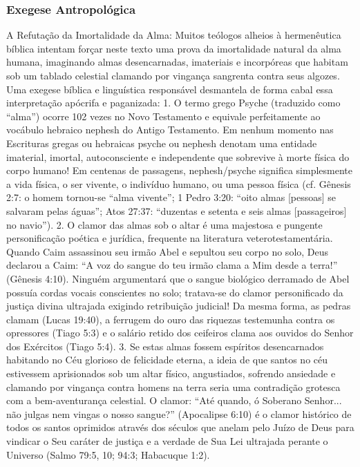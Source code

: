 \documentclass[11pt,a4paper,openany]{book}
\begin{document}
\subsubsection*{Exegese Antropológica}
A Refutação da Imortalidade da Alma:
Muitos teólogos alheios à hermenêutica bíblica intentam forçar neste texto uma prova da imortalidade natural da alma humana, imaginando almas desencarnadas, imateriais e incorpóreas que habitam sob um tablado celestial clamando por vingança sangrenta contra seus algozes. Uma exegese bíblica e linguística responsável desmantela de forma cabal essa interpretação apócrifa e paganizada:
1. O termo grego Psyche (traduzido como ``alma'') ocorre 102 vezes no Novo Testamento e equivale perfeitamente ao vocábulo hebraico nephesh do Antigo Testamento. Em nenhum momento nas Escrituras gregas ou hebraicas psyche ou nephesh denotam uma entidade imaterial, imortal, autoconsciente e independente que sobrevive à morte física do corpo humano! Em centenas de passagens, nephesh/psyche significa simplesmente a vida física, o ser vivente, o indivíduo humano, ou uma pessoa física (cf. Gênesis 2:7: o homem tornou-se ``alma vivente''; 1 Pedro 3:20: ``oito almas [pessoas] se salvaram pelas águas''; Atos 27:37: ``duzentas e setenta e seis almas [passageiros] no navio'').
2. O clamor das almas sob o altar é uma majestosa e pungente personificação poética e jurídica, frequente na literatura veterotestamentária. Quando Caim assassinou seu irmão Abel e sepultou seu corpo no solo, Deus declarou a Caim: ``A voz do sangue do teu irmão clama a Mim desde a terra!'' (Gênesis 4:10). Ninguém argumentará que o sangue biológico derramado de Abel possuía cordas vocais conscientes no solo; tratava-se do clamor personificado da justiça divina ultrajada exigindo retribuição judicial! Da mesma forma, as pedras clamam (Lucas 19:40), a ferrugem do ouro das riquezas testemunha contra os opressores (Tiago 5:3) e o salário retido dos ceifeiros clama aos ouvidos do Senhor dos Exércitos (Tiago 5:4).
3. Se estas almas fossem espíritos desencarnados habitando no Céu glorioso de felicidade eterna, a ideia de que santos no céu estivessem aprisionados sob um altar físico, angustiados, sofrendo ansiedade e clamando por vingança contra homens na terra seria uma contradição grotesca com a bem-aventurança celestial. O clamor: ``Até quando, ó Soberano Senhor... não julgas nem vingas o nosso sangue?'' (Apocalipse 6:10) é o clamor histórico de todos os santos oprimidos através dos séculos que anelam pelo Juízo de Deus para vindicar o Seu caráter de justiça e a verdade de Sua Lei ultrajada perante o Universo (Salmo 79:5, 10; 94:3; Habacuque 1:2).
\end{document}
